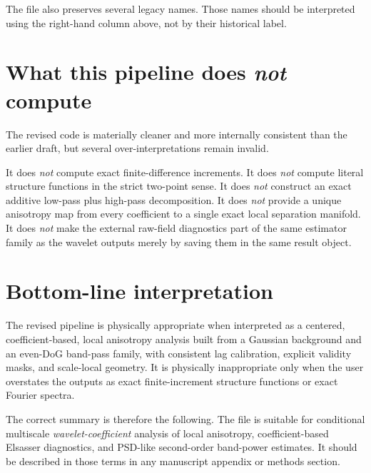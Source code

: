 \documentclass[11pt]{article}
\begin{document}
The file also preserves several legacy names. Those names should be interpreted using the right-hand column above, not by their historical label.

\section{What this pipeline does \emph{not} compute}

The revised code is materially cleaner and more internally consistent than the earlier draft, but several over-interpretations remain invalid.

It does \emph{not} compute exact finite-difference increments. It does \emph{not} compute literal structure functions in the strict two-point sense. It does \emph{not} construct an exact additive low-pass plus high-pass decomposition. It does \emph{not} provide a unique anisotropy map from every coefficient to a single exact local separation manifold. It does \emph{not} make the external raw-field diagnostics part of the same estimator family as the wavelet outputs merely by saving them in the same result object.

\section{Bottom-line interpretation}

The revised pipeline is physically appropriate when interpreted as a centered, coefficient-based, local anisotropy analysis built from a Gaussian background and an even-DoG band-pass family, with consistent lag calibration, explicit validity masks, and scale-local geometry. It is physically inappropriate only when the user overstates the outputs as exact finite-increment structure functions or exact Fourier spectra.

The correct summary is therefore the following. The file is suitable for conditional multiscale \emph{wavelet-coefficient} analysis of local anisotropy, coefficient-based Elsasser diagnostics, and PSD-like second-order band-power estimates. It should be described in those terms in any manuscript appendix or methods section.
\end{document}
